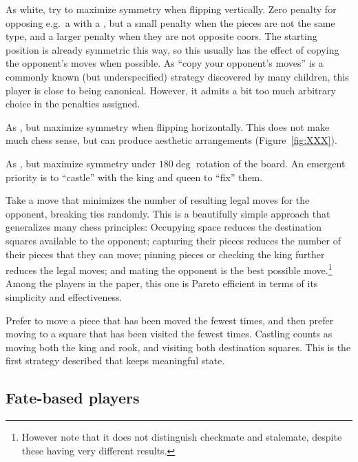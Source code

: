 \documentclass[10pt,preprint,twocolumn]{acmart}
\newcommand{\King}[1][1.95ex]{%
\adjustbox{Trim=2pt 2pt 2pt 0pt,width=#1,raise=-0.06ex,margin=0.13ex 0ex 0.13ex 0ex}{\BlackKingOnWhite}%
}%
\begin{document}
 As white, try to maximize symmetry
when flipping vertically. Zero penalty for opposing e.g.~a \King with
a \king, but a small penalty when the pieces are not the same type,
and a larger penalty when they are not opposite coors. The starting
position is already symmetric this way, so this usually has the effect
of copying the opponent's moves when possible. As ``copy your
opponent's moves'' is a commonly known (but underspecified) strategy
discovered by many children, this player is close to being canonical.
However, it admits a bit too much arbitrary choice in the penalties
assigned.

 As , but
maximize symmetry when flipping horizontally. This does not make much
chess sense, but can produce aesthetic arrangements
(Figure~\ref{fig:XXX}).

 As , but maximize
symmetry under $180\deg$ rotation of the board. An emergent priority is
to ``castle'' with the king and queen to ``fix'' them.

 Take a move that minimizes the
number of resulting legal moves for the opponent, breaking ties
randomly. This is a beautifully simple approach that generalizes many
chess principles: Occupying space reduces the destination squares
available to the opponent; capturing their pieces reduces the number
of their pieces that they can move; pinning pieces or checking the
king further reduces the legal moves; and mating the opponent is the
best possible move.\footnote{However note that it does not distinguish
  checkmate and stalemate, despite these having very different
  results.} Among the players in the paper, this one is Pareto
efficient in terms of its simplicity and effectiveness. \canonical

 Prefer to move a piece that has been
moved the fewest times, and then prefer moving to a square that
has been visited the fewest times. Castling counts as moving
both the king and rook, and visiting both destination squares.
This is the first strategy described that keeps meaningful state.
\canonical \stateful

\subsection{Fate-based players}
\end{document}
